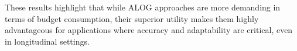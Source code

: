 These results highlight that while ALOG approaches are more demanding in terms of budget consumption, their superior utility makes them highly advantageous for applications where accuracy and adaptability are critical, even in longitudinal settings.




